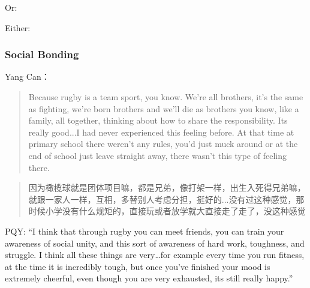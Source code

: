 \begin{CJK}{UTF8}{gbsn}
  Or:


  Either:




    \subsubsection{Social Bonding}



      Yang Can：
      \begin{quotation}
        Because rugby is a team sport, you know. We’re all brothers, it's the same as fighting, we’re born brothers and we’ll die as brothers you know, like a family, all together, thinking about how to share the responsibility. Its really good...I had never experienced this feeling before.  At that time at primary school there weren’t any rules, you’d just muck around or at the end of school just leave straight away, there wasn’t this type of feeling there.
      \end{quotation}


      \begin{quotation}
        因为橄榄球就是团体项目嘛，都是兄弟，像打架一样，出生入死得兄弟嘛，就跟一家人一样，互相，多替别人考虑分担，挺好的...没有过这种感觉，那时候小学没有什么规矩的，直接玩或者放学就大直接走了走了，没这种感觉
      \end{quotation}



PQY:
``I think that through rugby you can meet friends, you can train your awareness of social unity, and this sort of awareness of hard work, toughness, and struggle. I think all these things are very…for example every time you run fitness, at the time it is incredibly tough, but once you’ve finished your mood is extremely cheerful, even though you are very exhausted, its still really happy.''


\end{CJK}
